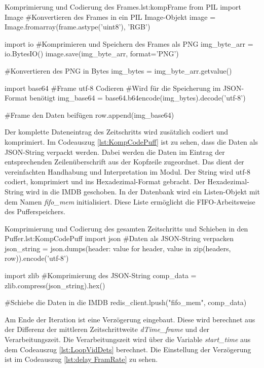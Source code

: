 \begin{pythoncode}{Komprimierung und Codierung des Frames.}{lst:kompFrame}
from PIL import Image
#Konvertieren des Frames in ein PIL Image-Objekt
image = Image.fromarray(frame.astype('uint8'), 'RGB')

import io
#Komprimieren und Speichern des Frames als PNG
img_byte_arr = io.BytesIO()
image.save(img_byte_arr, format='PNG')

#Konvertieren des PNG in Bytes
img_bytes = img_byte_arr.getvalue()

import base64
#Frame utf-8 Codieren
#Wird für die Speicherung im JSON-Format benötigt
img_base64 = base64.b64encode(img_bytes).decode('utf-8')

#Frame den Daten beifügen
row.append(img_base64)
\end{pythoncode}

Der komplette Dateneintrag des Zeitschritts wird zusätzlich codiert und komprimiert. Im Codeauszug \ref{lst:KompCodePuff} ist zu sehen, dass die Daten als JSON-String verpackt werden. Dabei werden die Daten im Eintrag der entsprechenden Zeilenüberschrift aus der Kopfzeile zugeordnet. Das dient der vereinfachten Handhabung und Interpretation im Modul. Der String wird utf-8 codiert, komprimiert und ins Hexadezimal-Format gebracht. Der Hexadezimal-String wird in die IMDB geschoben. In der Datenbank wird ein Listen-Objekt mit dem Namen \textit{fifo\_mem} initialisiert. Diese Liste ermöglicht die FIFO-Arbeitsweise des Pufferspeichers.

\begin{pythoncode}{Komprimierung und Codierung des gesamten Zeitschritts und Schieben in den Puffer.}{lst:KompCodePuff}
import json
#Daten als JSON-String verpacken
json_string = json.dumps({header: value for header, value in zip(headers, row)}).encode('utf-8')

import zlib
#Komprimierung des JSON-String 
comp_data = zlib.compress(json_string).hex()

#Schiebe die Daten in die IMDB
redis_client.lpush("fifo_mem", comp_data)
\end{pythoncode}

Am Ende der Iteration ist eine Verzögerung eingebaut. Diese wird berechnet aus der Differenz der mittleren Zeitschrittweite \textit{dTime\_frame} und der Verarbeitungszeit. Die Verarbeitungszeit wird über die Variable \textit{start\_time} aus dem Codeauszug \ref{lst:LoopVidDets} berechnet. Die Einstellung der Verzögerung ist im Codeauszug \ref{lst:delay FramRate} zu sehen.

